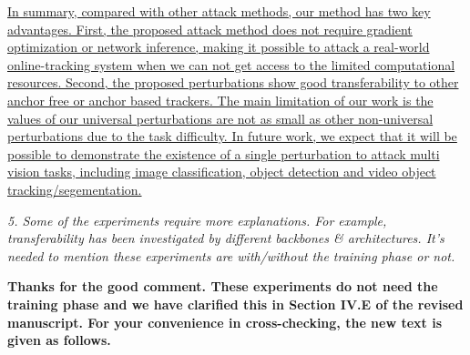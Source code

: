 \documentclass[12pt]{article}
\begin{document}
\uline{
In summary, compared with other attack methods, our method has two key advantages. First,
the proposed attack method does not require gradient optimization or network inference, making it possible to attack a real-world online-tracking system when we can not get access to the limited computational resources.
Second, the proposed perturbations show good transferability to other anchor free or anchor based trackers. 
The main limitation of our work is the values of our universal perturbations are not as small as other non-universal perturbations due to the task difficulty.
  In future work, we expect that it will be possible to demonstrate the existence of a single perturbation to attack multi vision tasks, including image classification, object detection and video object tracking/segementation.
}

\textit{5. Some of the experiments require more explanations. For example, transferability has been investigated by different backbones \& architectures. It's needed to mention these experiments are with/without the training phase or not.}

\textbf{Thanks for the good comment. These experiments do not need the training phase and we have clarified this in Section IV.E of the revised manuscript. For your convenience in cross-checking, the new text is given as follows.}
\end{document}
